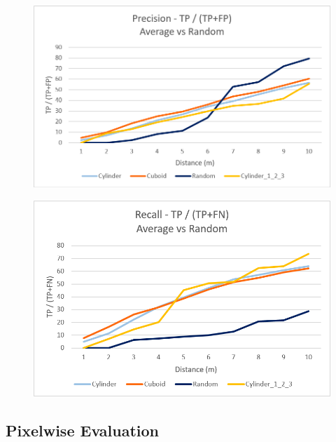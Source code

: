 \documentclass{subfiles}
\begin{document}
           \begin{figure} [h!]
           	\centering
           	\includegraphics[width=\textwidth]{img/dead/results/Precision_AveRan}
           	\caption{}
           	\label{fig:Precision_AveRan}
           \end{figure}
        
           
           \begin{figure} [h!]
           	\centering
           	\includegraphics[width=\textwidth]{img/dead/results/Recall_AveRan}
           	\caption{}
           	\label{fig:Recall_AveRan}
           \end{figure}
           
\subsection{Pixelwise Evaluation}
\end{document}
